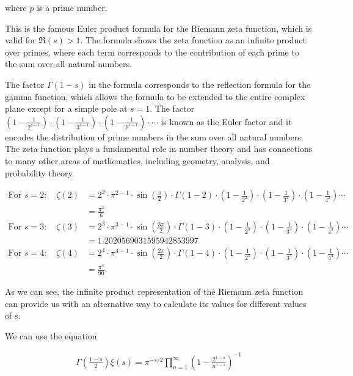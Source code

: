 \documentclass{article}
\begin{document}
where $p$ is a prime number.

This is the famous Euler product formula for the Riemann zeta function, which is valid for $\Re(s) > 1$. The formula shows the zeta function as an infinite product over primes, where each term corresponds to the contribution of each prime to the sum over all natural numbers.

The factor $\Gamma(1-s)$ in the formula corresponds to the reflection formula for the gamma function, which allows the formula to be extended to the entire complex plane except for a simple pole at $s=1$. The factor $(1 - \frac{1}{2^{s-1}}) \cdot (1 - \frac{1}{3^{s-1}}) \cdot (1 - \frac{1}{p^{s-1}}) \cdot \cdots$ is known as the Euler factor and it encodes the distribution of prime numbers in the sum over all natural numbers. The zeta function plays a fundamental role in number theory and has connections to many other areas of mathematics, including geometry, analysis, and probability theory.

\begin{align*}
\text{For } s = 2: \quad \zeta(2) &= 2^{2} \cdot \pi^{2-1} \cdot \sin(\frac{\pi}{2}) \cdot \Gamma(1-2) \cdot (1 - \frac{1}{2^2}) \cdot (1 - \frac{1}{3^2}) \cdot (1 - \frac{1}{4^2}) \cdots \\
&= \frac{\pi^2}{6} \\
\text{For } s = 3: \quad \zeta(3) &= 2^{3} \cdot \pi^{3-1} \cdot \sin(\frac{3\pi}{2}) \cdot \Gamma(1-3) \cdot (1 - \frac{1}{2^3}) \cdot (1 - \frac{1}{3^3}) \cdot (1 - \frac{1}{4^3}) \cdots \\
&= 1.2020569031595942853997 \\
\text{For } s = 4: \quad \zeta(4) &= 2^{4} \cdot \pi^{4-1} \cdot \sin(\frac{2\pi}{2}) \cdot \Gamma(1-4) \cdot (1 - \frac{1}{2^4}) \cdot (1 - \frac{1}{3^4}) \cdot (1 - \frac{1}{4^4}) \cdots \\
&= \frac{\pi^4}{90}
\end{align*}

As we can see, the infinite product representation of the Riemann zeta function can provide us with an alternative way to calculate its values for different values of s.

We can use the equation 

\begin{align*}
\Gamma\left(\frac{1-s}{2}\right)\xi(s) = \pi^{-s/2} \prod_{n=1}^{\infty} \left(1 - \frac{2^{1-s}}{n^{1-s}}\right)^{-1} \\
\end{align*}
\end{document}
